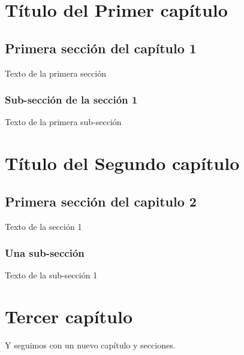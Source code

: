 \documentclass[12pt,letterpaper]{report}
\begin{document}
\tableofcontents

\chapter{Título del Primer capítulo}

\section{Primera sección del capítulo 1}
Texto de la primera sección

\subsection{Sub-sección de la sección 1}
Texto de la primera sub-sección



\chapter{Título del Segundo capítulo}

\section{Primera sección del capitulo 2}
Texto de la sección 1

\subsection{Una sub-sección}
Texto de la sub-sección 1 

\chapter{Tercer capítulo}
Y seguimos con un nuevo capítulo y secciones.
\end{document}
